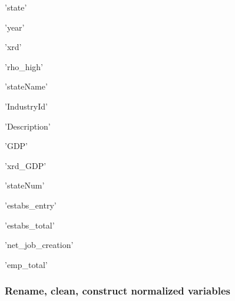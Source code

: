 \documentclass[11pt]{article}
\begin{document}
    \begin{enumerate*}
\item 'state'
\item 'year'
\item 'xrd'
\item 'rho\_high'
\item 'stateName'
\item 'IndustryId'
\item 'Description'
\item 'GDP'
\item 'xrd\_GDP'
\item 'stateNum'
\item 'estabs\_entry'
\item 'estabs\_total'
\item 'net\_job\_creation'
\item 'emp\_total'
\end{enumerate*}


    
    \hypertarget{rename-clean-construct-normalized-variables}{%
\subsubsection{Rename, clean, construct normalized
variables}\label{rename-clean-construct-normalized-variables}}
\end{document}
